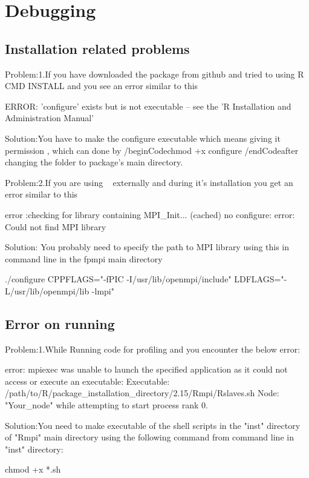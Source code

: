 \section{Debugging }
\label{sec:debug}


\subsection{Installation related problems}

{\color{red}Problem:1.}If you have downloaded the package from github and tried to using R CMD INSTALL  and you see an error similar to this
\begin{Output}
ERROR: 'configure' exists but is not executable -- see the 'R Installation and Administration Manual'
\end{Output}
{\color{green}Solution:}You have to make the configure executable which means giving it permission , which can done by /begin{Code}chmod +x configure /end{Code}after changing the folder to package's main directory.

{\color{red}Problem:2.}If you are using ~\citep{fpmpi} externally and during it's installation you get an error similar to this
\begin{Output}
error :checking for library containing MPI_Init... (cached) no configure: 
error: Could not find MPI library
\end{Output}
{\color{green}Solution:} You probably need to specify the path to MPI library using this in command line in the fpmpi main directory
\begin{Code}
./configure CPPFLAGS="-fPIC -I/usr/lib/openmpi/include" LDFLAGS="-L/usr/lib/openmpi/lib -lmpi"
\end{Code}

\subsection{Error on running}

{\color{red}Problem:1.}While Running  code for profiling and  you encounter the below error:
\begin{Output}
error: mpiexec was unable to launch the specified application as it could not access
or execute an executable:
Executable: /path/to/R/package_installation_directory/2.15/Rmpi/Rslaves.sh
Node: "Your_node"
while attempting to start process rank 0.
\end{Output}
{\color{green}Solution:}You need to make executable of the shell scripts in the "inst" directory of "Rmpi" main directory using the following command from command line in "inst" directory:
\begin{Code}
chmod +x *.sh
\end{Code}

